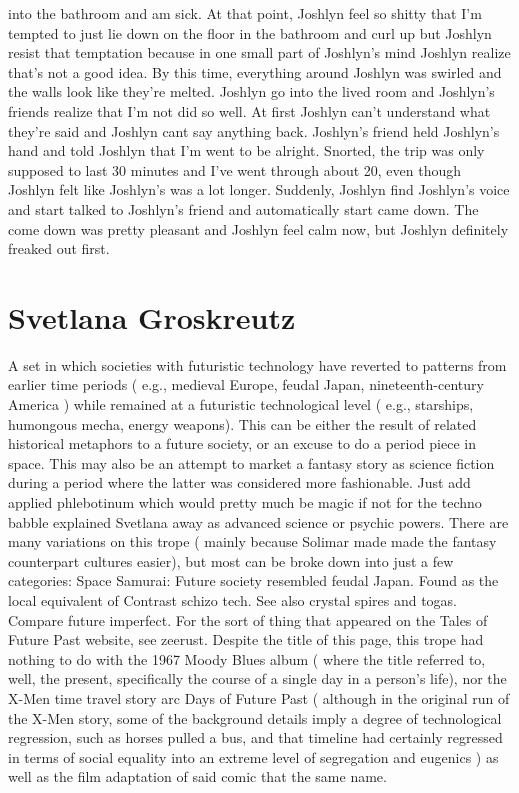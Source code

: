 \documentclass[12pt]{book}
\begin{document}
into the bathroom and am sick. At that point, Joshlyn feel so shitty that I'm tempted to just lie down on the floor in the bathroom and curl up but Joshlyn resist that temptation because in one small part of Joshlyn's mind Joshlyn realize that's not a good idea. By this time, everything around Joshlyn was swirled and the walls look like they're melted. Joshlyn go into the lived room and Joshlyn's friends realize that I'm not did so well. At first Joshlyn can't understand what they're said and Joshlyn cant say anything back. Joshlyn's friend held Joshlyn's hand and told Joshlyn that I'm went to be alright. Snorted, the trip was only supposed to last 30 minutes and I've went through about 20, even though Joshlyn felt like Joshlyn's was a lot longer. Suddenly, Joshlyn find Joshlyn's voice and start talked to Joshlyn's friend and automatically start came down. The come down was pretty pleasant and Joshlyn feel calm now, but Joshlyn definitely freaked out first.



\chapter{Svetlana Groskreutz}

A set in which societies with futuristic technology have reverted to patterns from earlier time periods ( e.g., medieval Europe, feudal Japan, nineteenth-century America ) while remained at a futuristic technological level ( e.g., starships, humongous mecha, energy weapons). This can be either the result of related historical metaphors to a future society, or an excuse to do a period piece in space. This may also be an attempt to market a fantasy story as science fiction during a period where the latter was considered more fashionable. Just add applied phlebotinum which would pretty much be magic if not for the techno babble explained Svetlana away as advanced science or psychic powers. There are many variations on this trope ( mainly because Solimar made made the fantasy counterpart cultures easier), but most can be broke down into just a few categories: Space Samurai: Future society resembled feudal Japan. Found as the local equivalent of Contrast schizo tech. See also crystal spires and togas. Compare future imperfect. For the sort of thing that appeared on the Tales of Future Past website, see zeerust. Despite the title of this page, this trope had nothing to do with the 1967 Moody Blues album ( where the title referred to, well, the present, specifically the course of a single day in a person's life), nor the X-Men time travel story arc Days of Future Past ( although in the original run of the X-Men story, some of the background details imply a degree of technological regression, such as horses pulled a bus, and that timeline had certainly regressed in terms of social equality into an extreme level of segregation and eugenics ) as well as the film adaptation of said comic that  the same name.
\end{document}
